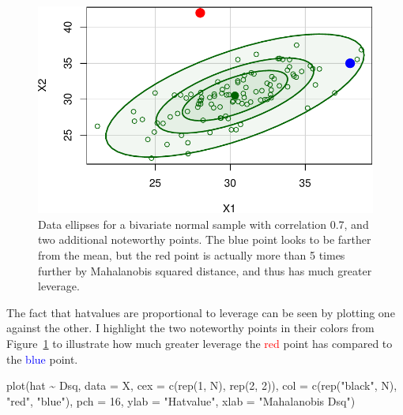 \documentclass[
  letterpaper,
  10pt,
  krantz2]{krantz}
\makeatletter
\newenvironment{Shaded}{\begin{snugshade}}{\end{snugshade}}
\newcommand{\AttributeTok}[1]{\textcolor[rgb]{0.40,0.45,0.13}{#1}}
\newcommand{\DecValTok}[1]{\textcolor[rgb]{0.68,0.00,0.00}{#1}}
\newcommand{\FunctionTok}[1]{\textcolor[rgb]{0.28,0.35,0.67}{#1}}
\newcommand{\NormalTok}[1]{\textcolor[rgb]{0.00,0.23,0.31}{#1}}
\newcommand{\SpecialCharTok}[1]{\textcolor[rgb]{0.37,0.37,0.37}{#1}}
\newcommand{\StringTok}[1]{\textcolor[rgb]{0.13,0.47,0.30}{#1}}
\newenvironment{kframe}{%
  \medskip{}
  \setlength{\fboxsep}{.8em}
  \def\at@end@of@kframe{}%
  \ifinner\ifhmode%
  \def\at@end@of@kframe{\end{minipage}}%
  \begin{minipage}{\columnwidth}%
  \fi\fi%
  \def\FrameCommand##1{\hskip\@totalleftmargin \hskip-\fboxsep
  \colorbox{shadecolor}{##1}\hskip-\fboxsep
      \hskip-\linewidth \hskip-\@totalleftmargin \hskip\columnwidth}%
  \MakeFramed {\advance\hsize-\width
    \@totalleftmargin\z@ \linewidth\hsize
    \@setminipage}}%
{\par\unskip\endMakeFramed%
  \at@end@of@kframe}
\renewenvironment{Shaded}{\begin{kframe}}{\end{kframe}}
\makeatother
\begin{document}
\begin{figure}[H]

{\centering \includegraphics{figs/fig-hatvalues-demo1-1.pdf}

}

\caption{\label{fig-hatvalues-demo1}Data ellipses for a bivariate normal
sample with correlation 0.7, and two additional noteworthy points. The
blue point looks to be farther from the mean, but the red point is
actually more than 5 times further by Mahalanobis squared distance, and
thus has much greater leverage.}

\end{figure}

The fact that hatvalues are proportional to leverage can be seen by
plotting one against the other. I highlight the two noteworthy points in
their colors from Figure~\ref{fig-hatvalues-demo1} to illustrate how
much greater leverage the \textcolor{red}{red} point has compared to the
\textcolor{blue}{blue} point.

\begin{Shaded}
\begin{Highlighting}[]
\FunctionTok{plot}\NormalTok{(hat }\SpecialCharTok{\textasciitilde{}}\NormalTok{ Dsq, }\AttributeTok{data =}\NormalTok{ X,}
     \AttributeTok{cex =} \FunctionTok{c}\NormalTok{(}\FunctionTok{rep}\NormalTok{(}\DecValTok{1}\NormalTok{, N), }\FunctionTok{rep}\NormalTok{(}\DecValTok{2}\NormalTok{, }\DecValTok{2}\NormalTok{)), }
     \AttributeTok{col =} \FunctionTok{c}\NormalTok{(}\FunctionTok{rep}\NormalTok{(}\StringTok{"black"}\NormalTok{, N), }\StringTok{"red"}\NormalTok{, }\StringTok{"blue"}\NormalTok{),}
     \AttributeTok{pch =} \DecValTok{16}\NormalTok{,}
     \AttributeTok{ylab =} \StringTok{"Hatvalue"}\NormalTok{,}
     \AttributeTok{xlab =} \StringTok{"Mahalanobis Dsq"}\NormalTok{)}
\end{Highlighting}
\end{Shaded}
\end{document}
